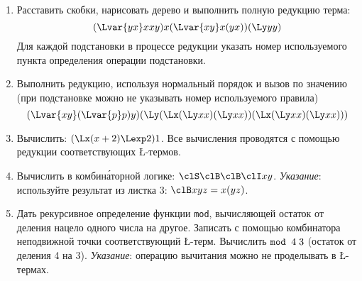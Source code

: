 \begin{enumerate}
    \itemsep=\myitemsep
    \item Расставить скобки, нарисовать дерево и выполнить полную редукцию
    терма:
    \[
        (\Lvar{yx} xxy) x (\Lvar{xy} x (yx)) (\Ly yy)
    \]
    Для каждой подстановки в процессе редукции указать номер используемого
    пункта определения операции подстановки.
    \item Выполнить редукцию, используя нормальный порядок и вызов по значению
    (при подстановке можно не указывать номер используемого правила)
    \[
        (\Lvar{xy} (\Lvar{p} p) y)
            (\Ly (\Lx (\Ly xx)(\Ly xx)) (\Lx (\Ly xx)(\Ly xx)))
    \]
    \item Вычислить: $(\Lx (x + 2) \Lexp 2) 1$. Все вычисления проводятся с
    помощью редукции соответствующих \L-термов.
    \item Вычислить в комбин\'{а}торной логике: $\clS \clB \clB  \clI xy$.
    \emph{Указание}: используйте результат из листка 3: $\clB xyz = x (yz)$.
    \item Дать рекурсивное определение функции \texttt{mod}, вычисляющей
    остаток от деления нацело одного числа на другое. Записать с помощью
    комбинатора неподвижной точки соответствующий \L-терм. Вычислить
    $\text{\ttfamily mod } 4\; 3$ (остаток от деления 4 на 3).
    \emph{Указание}: операцию вычитания можно не проделывать в \L-термах. 
\end{enumerate}